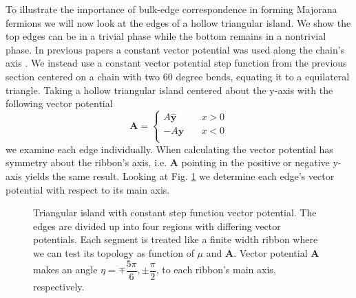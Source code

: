 \documentclass[aps,prb,showpacs,amsmath,twocolumn,amssymb,superscriptaddress]{revtex4-2}
\let\oldhat\hat
\renewcommand{\hat}[1]{\oldhat{\mathbf{#1}}}
\renewcommand{\vec}[1]{\mathbf{#1}}
\begin{document}
To illustrate the importance of bulk-edge correspondence in forming Majorana fermions we will now look at the edges of a hollow triangular island.
We show the top edges can be in a trivial phase while the bottom remains in a nontrivial phase.
In previous papers a constant vector potential was used along the chain's axis \cite{romitoManipulatingMajoranaFermions2012, takasanSupercurrentinducedTopologicalPhase2022}.
We instead use a constant vector potential step function from the previous section centered on a chain with two 60 degree bends, equating it to a equilateral triangle.
Taking a hollow triangular island centered about the y-axis with the following vector potential
\begin{equation}
  \vec{A} = \begin{cases}
            A \hat{y} \quad &x > 0 \\
            -A \hat{y} \quad &x < 0 \\
            \end{cases}
\end{equation}
we examine each edge individually.
When calculating  the vector potential has symmetry about the ribbon's axis, i.e. $\vec{A}$ pointing in the positive or negative y-axis yields the same result.
Looking at Fig. \ref{fig: triangular-island-vector-potential-divided} we determine each edge's vector potential with respect to its main axis.

\begin{figure}[]
  \caption{Triangular island with constant step function vector potential. The edges are divided up into four regions with differing vector potentials. Each segment is treated like a finite width ribbon where we can test its topology as function of $\mu$ and $\vec{A}$. Vector potential $\vec{A}$ makes an angle $\eta =  \mp \dfrac{5\pi}{6}, \pm \dfrac{\pi}{2}$, to each ribbon's main axis, respectively.}
  \label{fig: triangular-island-vector-potential-divided}
\end{figure}
\end{document}

